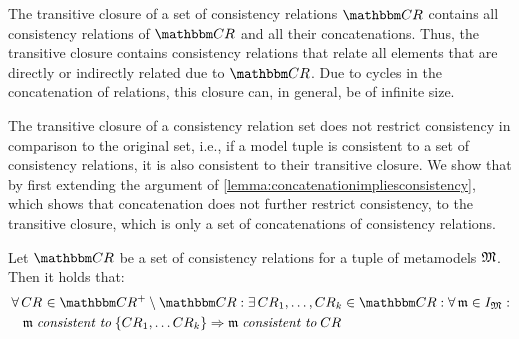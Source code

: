 The transitive closure of a set of consistency relations $\consistencyrelationset{CR}$ contains all consistency relations of $\consistencyrelationset{CR}$ and all their concatenations. Thus, the transitive closure contains consistency relations that relate all elements that are directly or indirectly related due to $\consistencyrelationset{CR}$.
Due to cycles in the concatenation of relations, this closure can, in general, be of infinite size.

The transitive closure of a consistency relation set does not restrict consistency in comparison to the original set, i.e., if a model tuple is consistent to a set of consistency relations, it is also consistent to their transitive closure.
We show that by first extending the argument of \autoref{lemma:concatenationimpliesconsistency}, which shows that concatenation does not further restrict consistency, to the transitive closure, which is only a set of concatenations of consistency relations.

\begin{lemma}
    Let $\consistencyrelationset{CR}$ be a set of consistency relations for a tuple of metamodels $\metamodeltuple{M}$. 
    Then it holds that:
    \begin{align*}
        &
        \forall \consistencyrelation{CR}{} \in \transitiveclosure{\consistencyrelationset{CR}{}} \setminus \consistencyrelationset{CR} :
        \exists \consistencyrelation{CR}{1}, \dots, \consistencyrelation{CR}{k} \in \consistencyrelationset{CR} : \forall \modeltuple{m} \in \metamodeltupleinstanceset{M} : \\
        & \formulaskip
        \modeltuple{m} \consistenttomath \setted{\consistencyrelation{CR}{1}, \dots \consistencyrelation{CR}{k}} \Rightarrow \modeltuple{m} \consistenttomath \consistencyrelation{CR}{} 
    \end{align*}
\end{lemma}

